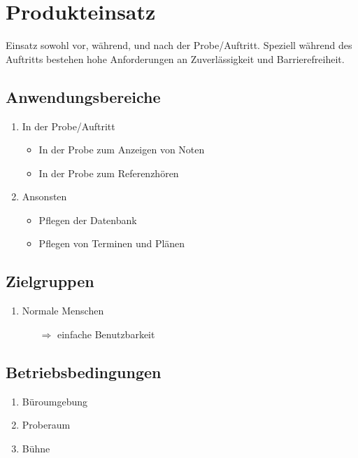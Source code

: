 
\section{Produkteinsatz}

Einsatz sowohl vor, während, und nach der Probe/Auftritt. Speziell während des Auftritts bestehen hohe Anforderungen an Zuverlässigkeit und Barrierefreiheit.

\subsection{Anwendungsbereiche}
\begin{enumerate}[{/AW}1{/}]
\item In der Probe/Auftritt
	\begin{itemize}
	\item In der Probe zum Anzeigen von Noten
	\item In der Probe zum Referenzhören
	\end{itemize}
\item Ansonsten 
	\begin{itemize}
	\item Pflegen der Datenbank
	\item Pflegen von Terminen und Plänen
	\end{itemize}
\end{enumerate}

\subsection{Zielgruppen}
\begin{enumerate}[{/ZG}1{/}]
\item Normale Menschen
	\begin{itemize}
	\item[$\Rightarrow$] einfache Benutzbarkeit
	\end{itemize}
\end{enumerate}

\subsection{Betriebsbedingungen}
\begin{enumerate}[{/BB}1{/}]
\item Büroumgebung
\item Proberaum
\item Bühne
\end{enumerate}